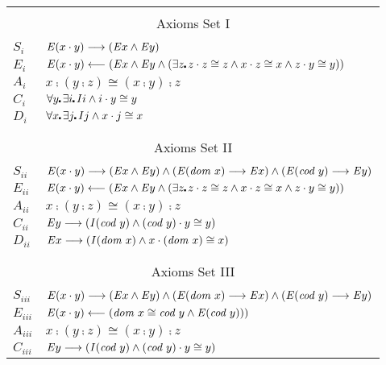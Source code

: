 \begin{table}[htp] \centering \normalsize
\begin{tabular}{ll}
\hline
\\
\multicolumn{2}{c}{Axioms Set I} \\
\\
 $S_{i}$ & $\mathit{E}(x \cdot y) \longrightarrow (\mathit{E} x \wedge \mathit{E} y)$ \\
 $E_{i}$ & $\ex(x \comp y) \limp (\ex x \wedge \ex y \wedge (\exists z\lambdot z \comp
         z \cong z \wedge x \comp z \cong x \wedge z \comp y \cong y))$ \\
 $A_{i}$ & $x\comp (y \comp z) \cong (x \comp y) \comp z$ \\
 $C_{i}$ & $\forall y\lambdot \exists i\lambdot  \id i \wedge i \comp y \cong y$ \\
 $D_{i}$ & $\forall x\lambdot \exists j\lambdot  \id j \wedge x \comp j \cong x$  \\
\\
\hline
\\
\multicolumn{2}{c}{Axioms Set II} \\
\\
$S_{ii}$ & $\mathit{E}(x \cdot y) \longrightarrow (\mathit{E} x \wedge \mathit{E} y) \wedge (\mathit{E} (\textit{dom \/} x) \longrightarrow \mathit{E}
        x) \wedge (\mathit{E} (\textit{cod \/} y) \longrightarrow \mathit{E}
        y)$ \\
 $E_{ii}$ & $\ex(x \comp y) \limp (\ex x \wedge \ex y \wedge (\exists z\lambdot z \comp
         z \cong z \wedge x \comp z \cong x \wedge z \comp y \cong y))$ \\
 $A_{ii}$ & $x\comp (y \comp z) \cong (x \comp y) \comp z$ \\
 $C_{ii}$ & $\mathit{E} y \longrightarrow (\textit{I\/}(\textit{cod \/} y) \wedge (\textit{cod \/} y) \cdot y \cong y)$ \\
 $D_{ii}$ & $\mathit{E} x \longrightarrow (\textit{I\/}(\textit{dom \/} x) \wedge x \cdot (\textit{dom \/} x) \cong x)$ \\
\\
\hline
\\
\multicolumn{2}{c}{Axioms Set III} \\
\\
$S_{iii}$ & $\mathit{E}(x \cdot y) \longrightarrow (\mathit{E} x \wedge \mathit{E} y) \wedge (\mathit{E} (\textit{dom \/} x) \longrightarrow \mathit{E}
        x) \wedge (\mathit{E} (\textit{cod \/} y) \longrightarrow \mathit{E}
        y)$ \\
 $E_{iii}$ & $\mathit{E}(x \cdot y) \longleftarrow (\textit{dom \/} x \cong \textit{cod \/} y \wedge \mathit{E} (\textit{cod \/} y)))$ \\
 $A_{iii}$ & $x\comp (y \comp z) \cong (x \comp y) \comp z$ \\
 $C_{iii}$ & $\mathit{E} y \longrightarrow (\textit{I\/}(\textit{cod \/} y) \wedge (\textit{cod \/} y) \cdot y \cong y)$ \\

\end{tabular}
\end{table}
